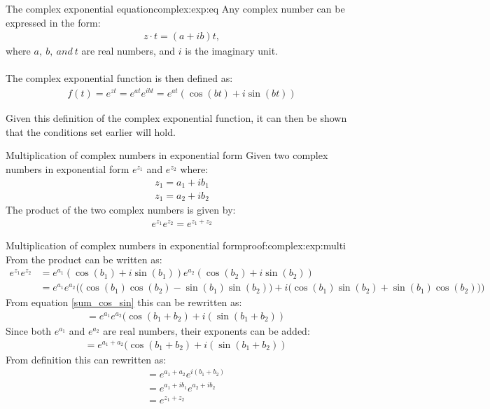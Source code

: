 \begin{definition}{The complex exponential equation}{complex:exp:eq}
Any complex number can be expressed in the form:
\begin{align*}
	z \cdot t = (a + ib)t,
\end{align*}
where $a,~b,~and~t$ are real numbers, and $i$ is the imaginary unit.
\\
\\
The complex exponential function is then defined as:
\begin{align*}
	f(t)=e^{zt}=e^{at}e^{ibt}=e^{at}\left(\cos(bt)+i\sin(bt)\right)
\end{align*}
\end{definition}
\noindent
Given this definition of the complex exponential function, it can then be shown that the conditions set earlier will hold.
\begin{theorem}{Multiplication of complex numbers in exponential form}{}
Given two complex numbers in exponential form $e^{z_1}$ and $e^{z_2}$ where:
\begin{align*}
z_1=a_1+ib_1
\\
z_1=a_2+ib_2
\end{align*}
The product of the two complex numbers is given by:
\begin{align*}
e^{z_1}e^{z_2}=e^{z_1+z_2}
\end{align*}
\end{theorem}
\begin{prof}{Multiplication of complex numbers in exponential form}{proof:complex:exp:multi}
From  the product can be written as:
\begin{align*}
e^{z_1}e^{z_2}&=e^{a_1}(\cos(b_1)+i\sin(b_1))e^{a_2}(\cos(b_2)+i\sin(b_2))
\\
&=e^{a_1}e^{a_2} \bigg( \big(\cos(b_1)\cos(b_2)-\sin(b_1) \sin(b_2) \big)+i \big(\cos(b_1)\sin(b_2)+\sin(b_1)\cos(b_2) \big) \bigg)
\end{align*}
From equation \eqref{sum_cos_sin} this can be rewritten as:
\begin{align*}
&=e^{a_1}e^{a_2}(\cos(b_1+b_2)+i(\sin(b_1+b_2))
\end{align*}
Since both $e^{a_1}$ and $e^{a_2}$ are real numbers, their exponents can be added:
\begin{align*}
&=e^{a_1+a_2}(\cos(b_1+b_2)+i(\sin(b_1+b_2))
\end{align*}
From definition 
this can rewritten as:
\begin{align*}
&=e^{a_1+a_2}e^{i(b_1+b_2)}
\\
&=e^{a_1+ib_1}e^{a_2+ib_2}
\\
&=e^{z_1+z_2}
\end{align*} 
\end{prof}
